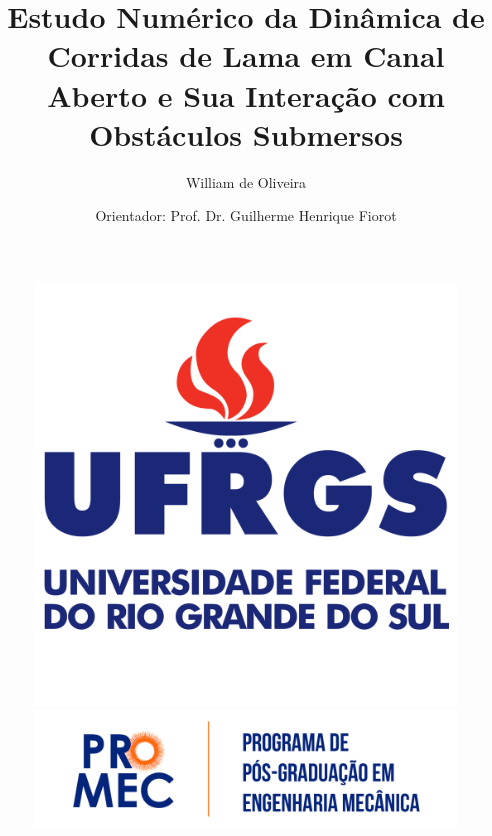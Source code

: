 \documentclass[aspectratio=169]{beamer}
\author{William de Oliveira}
\title[Introdução à Comunicação Científica e Projeto]{Estudo Numérico da Dinâmica de Corridas de Lama em Canal Aberto e Sua Interação com Obstáculos Submersos}
\subtitle{}
\institute{UFRGS | PROMEC | MEC-153}
\date{Orientador: Prof. Dr. Guilherme Henrique Fiorot}
\begin{document}
\begin{frame}
    \titlepage
    \vspace{-10pt}
    \begin{figure}
        \centering
        \begin{minipage}[c][0.2\textheight][c]{0.24\textwidth}
            \centering
            \includegraphics[height=0.24\textheight]{images/logos/ufrgs.png}
        \end{minipage}
        \hfill
        \begin{minipage}[c][0.2\textheight][c]{0.24\textwidth}
            \centering
            \includegraphics[height=0.18\textheight]{images/logos/promec.png}
        \end{minipage}
        \hfill
        \begin{minipage}[c][0.2\textheight][c]{0.24\textwidth}
            \centering

\end{minipage}
\end{figure}
\end{frame}
\end{document}
